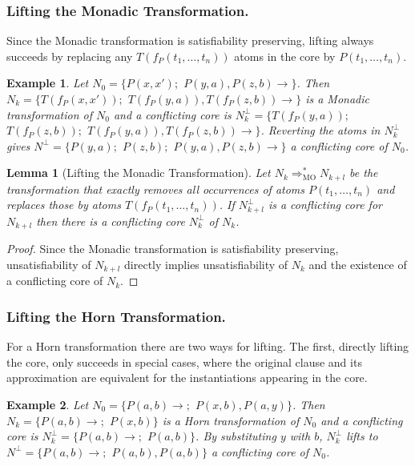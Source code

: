 \documentclass{llncs}
\newcommand{\imp}{\rightarrow}
\newtheorem{lem}[theorem]{Lemma}
\newtheorem{exmp}{Example}
\begin{document}
\subsubsection{Lifting the Monadic Transformation.}
Since the Monadic transformation is satisfiability preserving, lifting always succeeds by replacing any $T(f_P(t_1,\dots,t_n))$ atoms in the core  by $P(t_1,\dots,t_n)$.

\begin{exmp}\label{LiftMonadicEx}
Let $N_0 = \{ P(x,x');$ $P(y,a),P(z,b) \imp \}$. 
Then $N_k=  \{ T(f_P(x,x'));$ $T(f_P(y,a)),T(f_P(z,b)) \imp \}$ is a Monadic transformation of $N_0$
and a conflicting core is $N^\bot_k= \{ T(f_P(y,a));$ $T(f_P(z,b));$ $T(f_P(y,a)),T(f_P(z,b)) \imp \}$.
Reverting the atoms in  $N^\bot_k$ gives $N^\bot=\{ P(y,a);$ $P(z,b);$ $P(y,a),P(z,b)\imp\}$ a conflicting core of $N_0$.
\end{exmp} 


\begin{lem}[Lifting the Monadic Transformation]\label{liftmonadic}
Let $N_k\Rightarrow^*_{\text{MO}} N_{k+l}$ be the transformation  that exactly removes all occurrences of atoms $P(t_1,\dots,t_n)$ and replaces those by atoms $T(f_P(t_1,\dots,t_n))$.
If $N^\bot_{k+l}$ is a conflicting core for $N_{k+l}$ then there is a conflicting core $N^\bot_k$ of $N_k$.
\end{lem}

\begin{proof}
Since the Monadic transformation is satisfiability preserving, unsatisfiability of $N_{k+l}$ directly implies unsatisfiability of $N_{k}$ and the existence of a conflicting core of $N_{k}$.
\end{proof}

\subsubsection{Lifting the Horn Transformation.}
For a Horn transformation there are two ways for lifting.
The first, directly lifting the core, only succeeds in special cases, where the original clause and its approximation are  equivalent 
for the instantiations appearing in the core.

\begin{exmp}\label{LiftHornEx}
Let $N_0 = \{ P(a,b) \imp;$ $ P(x,b),P(a,y) \}$. 
Then $N_k=  \{ P(a,b) \imp;$ $ P(x,b) \}$ is a Horn transformation of $N_0$
and a conflicting core is $N^\bot_k= \{ P(a,b) \imp;$ $ P(a,b) \}$.
By substituting $y$ with $b$,  $N^\bot_k$ lifts to $N^\bot=\{  P(a,b) \imp;$ $ P(a,b) , P(a,b) \}$ a conflicting core of $N_0$.
\end{exmp} 
\end{document}
